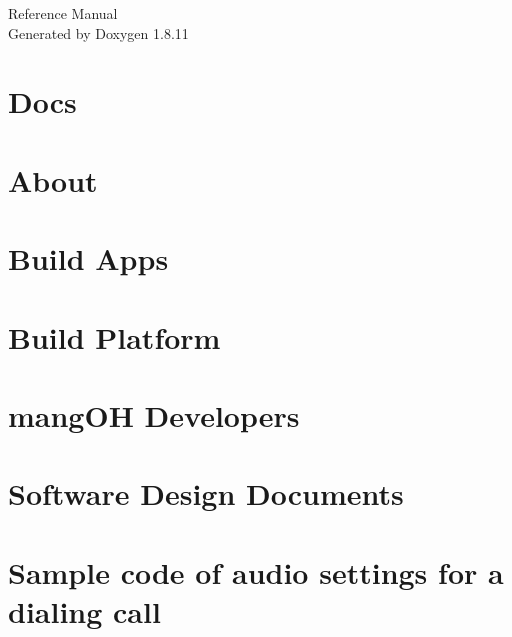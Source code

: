 \documentclass[twoside]{book}
\newcommand{\+}{\discretionary{\mbox{\scriptsize$\hookleftarrow$}}{}{}}
\newcommand{\clearemptydoublepage}{%
  \newpage{\pagestyle{empty}\cleardoublepage}%
}
\begin{document}
\hypersetup{pageanchor=false,
             bookmarksnumbered=true,
             pdfencoding=unicode
            }
\begin{titlepage}
\vspace*{7cm}
\begin{center}%
{\Large Reference Manual}\\
\vspace*{1cm}
{\large Generated by Doxygen 1.8.11}\\
\end{center}
\end{titlepage}
\clearemptydoublepage
\tableofcontents
\clearemptydoublepage
{}
\hypersetup{pageanchor=true}

\chapter{Docs}
\label{index}\hypertarget{index}{}
\chapter{About}
\label{aboutMain}
\hypertarget{aboutMain}{}

\chapter{Build Apps}
\label{buildAppsMain}
\hypertarget{buildAppsMain}{}

\chapter{Build Platform}
\label{buildPlatformMain}
\hypertarget{buildPlatformMain}{}

\chapter{mang\+OH Developers}
\label{mangohDevelopers}
\hypertarget{mangohDevelopers}{}

\chapter{Software Design Documents}
\label{c_sdd}
\hypertarget{c_sdd}{}

\chapter{Sample code of audio settings for a dialing call}
\label{c_audioMcc}
\hypertarget{c_audioMcc}{}

\end{document}
